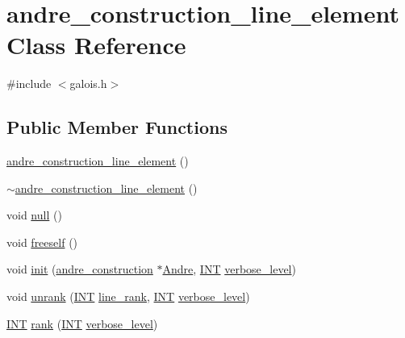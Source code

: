 \hypertarget{classandre__construction__line__element}{}\section{andre\+\_\+construction\+\_\+line\+\_\+element Class Reference}
\label{classandre__construction__line__element}


{\ttfamily \#include $<$galois.\+h$>$}

\subsection*{Public Member Functions}
\begin{DoxyCompactItemize}
\item 
\mbox{\hyperlink{classandre__construction__line__element_a09cd94d28949192bf710a279062441dc}{andre\+\_\+construction\+\_\+line\+\_\+element}} ()
\item 
\mbox{\hyperlink{classandre__construction__line__element_a6ec35284816050fb2fc1dced3369c4c1}{$\sim$andre\+\_\+construction\+\_\+line\+\_\+element}} ()
\item 
void \mbox{\hyperlink{classandre__construction__line__element_a146b0e1fc8f112c5bff5db0f35bc39f1}{null}} ()
\item 
void \mbox{\hyperlink{classandre__construction__line__element_ae45739a19eb3b4d18fc7b2adfce70bfa}{freeself}} ()
\item 
void \mbox{\hyperlink{classandre__construction__line__element_a65d6694998f9027d1ad2bf695cc2de3c}{init}} (\mbox{\hyperlink{classandre__construction}{andre\+\_\+construction}} $\ast$\mbox{\hyperlink{classandre__construction__line__element_a502f19df8babe6fcf1fea1b5ffe8c0b1}{Andre}}, \mbox{\hyperlink{galois_8h_a09fddde158a3a20bd2dcadb609de11dc}{I\+NT}} \mbox{\hyperlink{simeon_8_c_a818073fbcc2f439e7c56952f67386122}{verbose\+\_\+level}})
\item 
void \mbox{\hyperlink{classandre__construction__line__element_aed49dd3f4b7d7ef3ce6ce03fbb641ae4}{unrank}} (\mbox{\hyperlink{galois_8h_a09fddde158a3a20bd2dcadb609de11dc}{I\+NT}} \mbox{\hyperlink{classandre__construction__line__element_af55a0c290e857b6a6fbf0c3aafc64aeb}{line\+\_\+rank}}, \mbox{\hyperlink{galois_8h_a09fddde158a3a20bd2dcadb609de11dc}{I\+NT}} \mbox{\hyperlink{simeon_8_c_a818073fbcc2f439e7c56952f67386122}{verbose\+\_\+level}})
\item 
\mbox{\hyperlink{galois_8h_a09fddde158a3a20bd2dcadb609de11dc}{I\+NT}} \mbox{\hyperlink{classandre__construction__line__element_ab2920079fa51c95a3e245a7f1a70ae66}{rank}} (\mbox{\hyperlink{galois_8h_a09fddde158a3a20bd2dcadb609de11dc}{I\+NT}} \mbox{\hyperlink{simeon_8_c_a818073fbcc2f439e7c56952f67386122}{verbose\+\_\+level}})

\end{DoxyCompactItemize}
